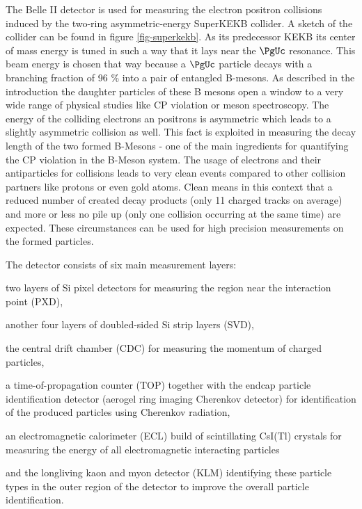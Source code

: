 The Belle II detector is used for measuring the electron positron collisions induced by the two-ring asymmetric-energy SuperKEKB collider. A sketch of the collider can be found in figure \ref{fig-superkekb}. As its predecessor KEKB its center of mass energy is tuned in such a way that it lays near the $\PgUc$ resonance. This beam energy is chosen that way because a $\PgUc$ particle decays with a branching fraction of 96 \% into a pair of entangled B-mesons. As described in the introduction the daughter particles of these B mesons open a window to a very wide range of physical studies like CP violation or meson spectroscopy. The energy of the colliding electrons an positrons is asymmetric which leads to a slightly asymmetric collision as well. This fact is exploited in measuring the decay length of the two formed B-Mesons - one of the main ingredients for quantifying the CP violation in the B-Meson system. The usage of electrons and their antiparticles for collisions leads to very clean events compared to other collision partners like protons or even gold atoms. Clean means in this context that a reduced number of created decay products (only 11 charged tracks on average) and more or less no pile up (only one collision occurring at the same time) are expected. These circumstances can be used for high precision measurements on the formed particles.

The detector consists of six main measurement layers:
\begin{zlist}
  \item two layers of Si pixel detectors for measuring the region near the interaction point (PXD),
  \item another four layers of doubled-sided Si strip layers (SVD),
  \item the central drift chamber (CDC) for measuring the momentum of charged particles,
  \item a time-of-propagation counter (TOP) together with the endcap particle identification detector (aerogel ring imaging Cherenkov detector) for identification of the produced particles using Cherenkov radiation,
  \item an electromagnetic calorimeter (ECL) build of scintillating CsI(Tl) crystals for measuring the energy of all electromagnetic interacting particles
  \item and the longliving kaon and myon detector (KLM) identifying these particle types in the outer region of the detector to improve the overall particle identification.
\end{zlist}


